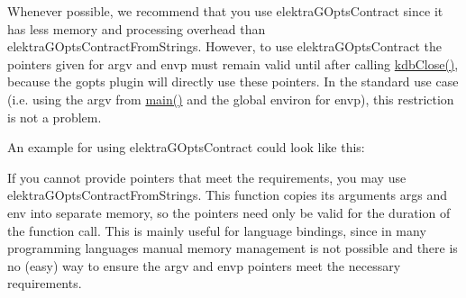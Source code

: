 Whenever possible, we recommend that you use {\ttfamily elektra\+G\+Opts\+Contract} since it has less memory and processing overhead than {\ttfamily elektra\+G\+Opts\+Contract\+From\+Strings}. However, to use {\ttfamily elektra\+G\+Opts\+Contract} the pointers given for {\ttfamily argv} and {\ttfamily envp} must remain valid until after calling {\ttfamily \hyperlink{group__kdb_gadb54dc9fda17ee07deb9444df745c96f}{kdb\+Close()}}, because the {\ttfamily gopts} plugin will directly use these pointers. In the standard use case (i.\+e. using the {\ttfamily argv} from {\ttfamily \hyperlink{testio__doc_8c_a3c04138a5bfe5d72780bb7e82a18e627}{main()}} and the global {\ttfamily environ} for {\ttfamily envp}), this restriction is not a problem.

An example for using {\ttfamily elektra\+G\+Opts\+Contract} could look like this\+:




If you cannot provide pointers that meet the requirements, you may use {\ttfamily elektra\+G\+Opts\+Contract\+From\+Strings}. This function copies its arguments {\ttfamily args} and {\ttfamily env} into separate memory, so the pointers need only be valid for the duration of the function call. This is mainly useful for language bindings, since in many programming languages manual memory management is not possible and there is no (easy) way to ensure the {\ttfamily argv} and {\ttfamily envp} pointers meet the necessary requirements.

